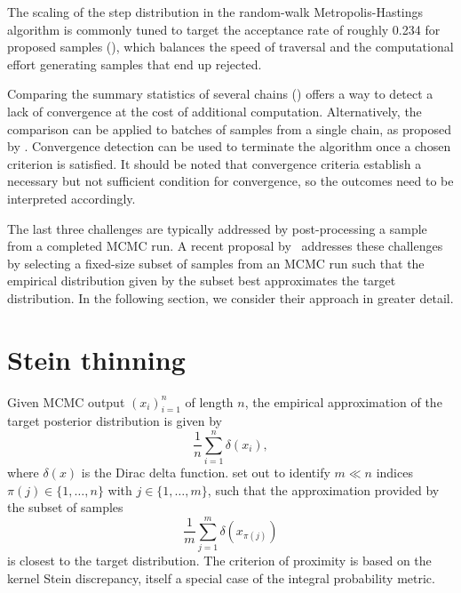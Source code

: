 \documentclass[11pt,a4paper]{report}
\begin{document}
The scaling of the step distribution in the random-walk Metropolis-Hastings algorithm is commonly tuned to target the acceptance rate of roughly 0.234 for proposed samples (\cite{gelmanEfficientMetropolisJumping1996,gelmanWeakConvergenceOptimal1997,robertsOptimalScalingVarious2001}), which balances the speed of traversal and the computational effort generating samples that end up rejected.

Comparing the summary statistics of several chains (\cite{gelmanInferenceIterativeSimulation1992,brooksGeneralMethodsMonitoring1998,vehtariRankNormalizationFoldingLocalization2021}) offers a way to detect a lack of convergence at the cost of additional computation. Alternatively, the comparison can be applied to batches of samples from a single chain, as proposed by \cite{vatsRevisitingGelmanRubin2021}. Convergence detection can be used to terminate the algorithm once a chosen criterion is satisfied. It should be noted that convergence criteria establish a necessary but not sufficient condition for convergence, so the outcomes need to be interpreted accordingly.

The last three challenges are typically addressed by post-processing a sample from a completed MCMC run. A recent proposal by~\cite{riabizOptimalThinningMCMC2022} addresses these challenges by selecting a fixed-size subset of samples from an MCMC run such that the empirical distribution given by the subset best approximates the target distribution. In the following section, we consider their approach in greater detail.


\section{Stein thinning}
\label{sec:stein-thinning}

Given MCMC output $(x_i)_{i=1}^n$ of length $n$, the empirical approximation of the target posterior distribution is given by
\begin{equation}
\frac{1}{n} \sum_{i=1}^n \delta(x_i),
\label{eq:discrete-distribution}
\end{equation}
where $\delta(x)$ is the Dirac delta function.
\cite{riabizOptimalThinningMCMC2022} set out to identify $m \ll n$ indices $\pi(j) \in \{1,\dots, n\}$ with $j\in\{1, \dots, m\}$, such that the approximation provided by the subset of samples
\begin{equation}
\frac{1}{m} \sum_{j=1}^m \delta(x_{\pi(j)})
\label{eq:thinned-sample}
\end{equation}
is closest to the target distribution. The criterion of proximity is based on the kernel Stein discrepancy, itself a special case of the integral probability metric.
\end{document}
